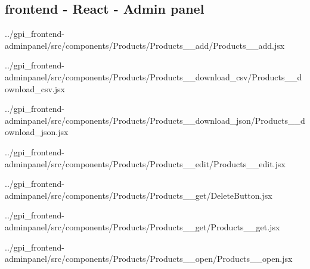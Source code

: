 \documentclass[12pt, a4paper, simple]{eskdtext}
\begin{document}
    \subsection*{frontend - React - Admin panel}
    
    
    
    
    
    
    
    
    
    
    
    
        {../gpi_frontend-adminpanel/src/components/Products/Products__add/Products__add.jsx}
    
        {../gpi_frontend-adminpanel/src/components/Products/Products__download_csv/Products__download_csv.jsx}
    
        {../gpi_frontend-adminpanel/src/components/Products/Products__download_json/Products__download_json.jsx}
    
        {../gpi_frontend-adminpanel/src/components/Products/Products__edit/Products__edit.jsx}
    
        {../gpi_frontend-adminpanel/src/components/Products/Products__get/DeleteButton.jsx}
    
        {../gpi_frontend-adminpanel/src/components/Products/Products__get/Products__get.jsx}
    
        {../gpi_frontend-adminpanel/src/components/Products/Products__open/Products__open.jsx}
\end{document}
